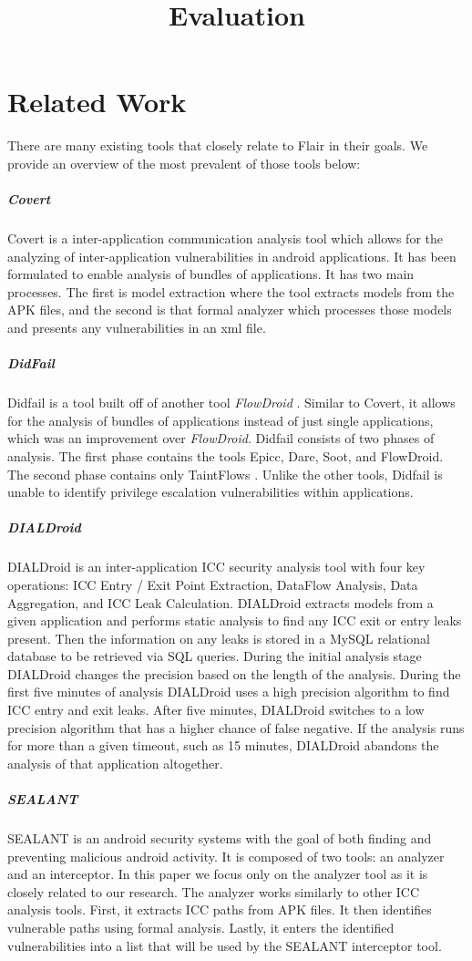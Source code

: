 \documentclass[twocolumn]{article}
\title{Evaluation}
\begin{document}
\section[1]{Related Work}
	There are many existing tools that closely relate to Flair in their goals. We provide an overview of the most prevalent of those tools below:
	\subparagraph{Covert}
		Covert is a inter-application communication analysis tool which allows for the analyzing of inter-application vulnerabilities in android applications. It has been formulated to enable analysis of bundles of applications. It has two main processes. The first is model extraction where the tool extracts models from the APK files, and the second is that formal analyzer which processes those models and presents any vulnerabilities in an xml file\cite{Covert}.
	\subparagraph{DidFail}
		Didfail is a tool built off of another tool \textit{FlowDroid} \cite{Didfail}. Similar to Covert, it allows for the analysis of bundles of applications instead of just single applications, which was an improvement over \textit{FlowDroid}. Didfail consists of two phases of analysis. The first phase contains the tools Epicc, Dare, Soot, and FlowDroid. The second phase contains only TaintFlows \cite{Didfail}. Unlike the other tools, Didfail is unable to identify privilege escalation vulnerabilities within applications. 

	\subparagraph{DIALDroid}
		DIALDroid is an inter-application ICC security analysis tool with four key operations: ICC Entry / Exit Point Extraction, DataFlow Analysis, Data Aggregation, and ICC Leak Calculation\cite{DIALDroid}. DIALDroid extracts models from a given application and performs static analysis to find any ICC exit or entry leaks present. Then the information on any leaks is stored in a MySQL relational database to be retrieved via SQL queries. During the initial analysis stage DIALDroid changes the precision based on the length of the analysis. During the first five minutes of analysis DIALDroid uses a high precision algorithm to find ICC entry and exit leaks. After five minutes, DIALDroid switches to a low precision algorithm that has a higher chance of false negative. If the analysis runs for more than a given timeout, such as 15 minutes, DIALDroid abandons the analysis of that application altogether\cite{DIALDroid}.
	\subparagraph{SEALANT}
		SEALANT is an android security systems with the goal of both finding and preventing malicious android activity. It is composed of two tools: an analyzer and an interceptor. In this paper we focus only on the analyzer tool as it is closely related to our research. The analyzer works similarly to other ICC analysis tools. First, it extracts ICC paths from APK files. It then identifies vulnerable paths using formal analysis. Lastly, it enters the identified vulnerabilities into a list that will be used by the SEALANT interceptor tool.
\end{document}
